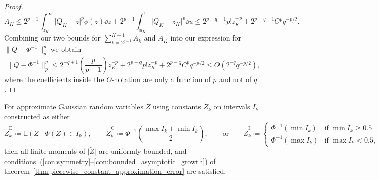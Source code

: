 \documentclass[manuscript,review]{acmart}
\begin{document}
\begin{proof}
\begin{equation*}
A_K 
\leq 2^{p-1} \int_{z_K}^{\infty} \lvert Q_K - z\rvert^p \phi(z) \dd{z} +  2^{p-1} \int_{u_K}^{1} \lvert Q_K - z_K \rvert^p \dd{u} 
\leq 2^{p-q-1} p! z_K^{-p} + 2^{p-q-1} C^p q^{-p/2}.
\end{equation*}
Combining our two bounds for $ \sum_{k=2^{q-1}}^{K-1} A_k $ and $ A_K $ into our expression for  $ \lVert Q - \Phi^{-1}\rVert_p^p $ we obtain
\begin{equation*}
\lVert Q - \Phi^{-1}\rVert_p^p 
\leq 2^{-q+1} \left(\frac{p}{p-1}\right) z_K^{-p} + 2^{p-q} p! z_K^{-p} + 2^{p-q} C^p q^{-p/2} 
\leq O(2^{-q}q^{-p/2}),
\end{equation*}
where the coefficients inside the $ O $-notation are only a function of $ p $ and not of $ q $. \qedhere
\end{proof}

\begin{corollary}
\label{cor:piecewise_constant_constructions}
For approximate Gaussian random variables $ \widetilde{Z} $ using constants $ \widetilde{Z}_k $ on intervals $ I_k $ constructed as either
\begin{equation*}
\label{eqt:approximate_normal_expected_value_construction}
\widetilde{Z}_k^\mathrm{E} \coloneqq \mathbb{E}(Z\mid \Phi(Z) \in I_k), 
\qquad 
\widetilde{Z}_k^\mathrm{C} \coloneqq {\Phi^{-1}}\left(\dfrac{\max I_k + \min I_k}{2}\right), 
\qquad \text{or} \qquad 
\widetilde{Z}_k^\mathrm{I} \coloneqq 
\begin{cases}
\Phi^{-1}(\min I_k) & \text{if } \min I_k \geq 0.5 \\
\Phi^{-1}(\max I_k) & \text{if } \max I_k < 0.5, 
\end{cases}
\end{equation*}
then all finite moments of $ \lvert\widetilde{Z}\rvert $ are uniformly bounded, and conditions~(\ref{con:symmetry}--\ref{con:bounded_asymptotic_growth}) of theorem~\ref{thm:piecewise_constant_approximation_error} are satisfied. 
\end{corollary}
\end{document}
